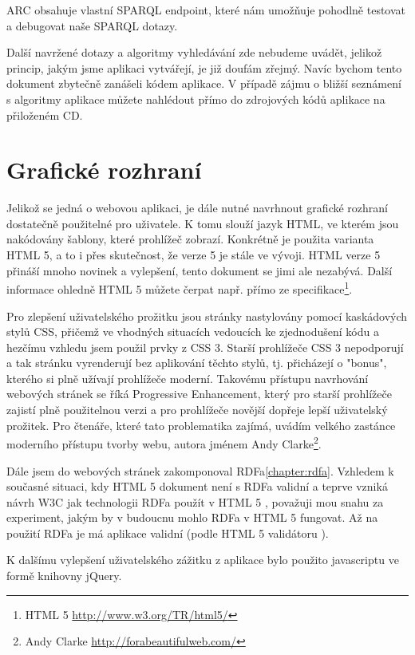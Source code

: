 ARC obsahuje vlastní SPARQL endpoint, které nám umožňuje pohodlně testovat a debugovat naše SPARQL dotazy.

Další navržené dotazy a algoritmy vyhledávání zde nebudeme uvádět, jelikož princip, jakým jsme aplikaci vytvářejí, je již doufám zřejmý. Navíc bychom tento dokument zbytečně zanášeli kódem aplikace.
V případě zájmu o bližší seznámení s algoritmy aplikace můžete nahlédout přímo do zdrojových kódů aplikace na přiloženém CD.


\section{Grafické rozhraní}

Jelikož se jedná o webovou aplikaci, je dále nutné navrhnout grafické rozhraní dostatečně použitelné pro uživatele.
K tomu slouží jazyk HTML, ve kterém jsou nakódovány šablony, které prohlížeč zobrazí.
Konkrétně je použita varianta HTML 5, a to i přes skutečnost, že verze 5 je stále ve vývoji.
HTML verze 5 přináší mnoho novinek a vylepšení, tento dokument se jimi ale nezabývá. Další informace ohledně HTML 5 můžete čerpat např. přímo ze specifikace\footnote{HTML 5 \url{http://www.w3.org/TR/html5/}}.

Pro zlepšení uživatelského prožitku jsou stránky nastylovány pomocí kaskádových stylů CSS, přičemž ve vhodných situacích vedoucích ke zjednodušení kódu a hezčímu vzhledu jsem použil prvky z CSS 3.
Starší prohlížeče CSS 3 nepodporují a tak stránku vyrenderují bez aplikování těchto stylů, tj. přicházejí o "bonus", kterého si plně užívají prohlížeče moderní.
Takovému přístupu navrhování webových stránek se říká Progressive Enhancement, který pro starší prohlížeče zajistí plně použitelnou verzi a pro prohlížeče novější dopřeje lepší uživatelský prožitek. 
Pro čtenáře, které tato problematika zajímá, uvádím velkého zastánce moderního přístupu tvorby webu, autora jménem Andy Clarke\footnote{Andy Clarke \url{http://forabeautifulweb.com/}}.

Dále jsem do webových stránek zakomponoval RDFa\ref{chapter:rdfa}.
Vzhledem k současné situaci, kdy HTML 5 dokument není s RDFa validní a teprve vzniká návrh W3C jak technologii RDFa použít v HTML 5 \cite{html5rdfa}, 
považuji mou snahu za experiment, jakým by v budoucnu mohlo RDFa v HTML 5 fungovat. Až na použití RDFa je má aplikace validní (podle HTML 5 validátoru \cite{html5val}).

K dalšímu vylepšení uživatelského zážitku z aplikace bylo použito javascriptu ve formě knihovny jQuery.
   
